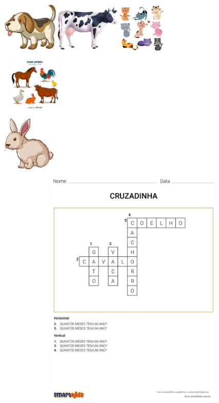 \begin{escola}
\includegraphics[width=1.06250in,height=0.94306in]{media/image91.jpg}\includegraphics[width=1.24583in,height=0.90625in]{media/image92.jpg}\includegraphics[width=0.97639in,height=0.92708in]{media/image93.jpg}

\includegraphics[width=1.25000in,height=0.99097in]{media/image94.jpg}

\includegraphics[width=0.99722in,height=1.03125in]{media/image95.jpg}

\includegraphics[width=5.90556in,height=4.47101in]{media/image96.jpg}


\end{escola}
